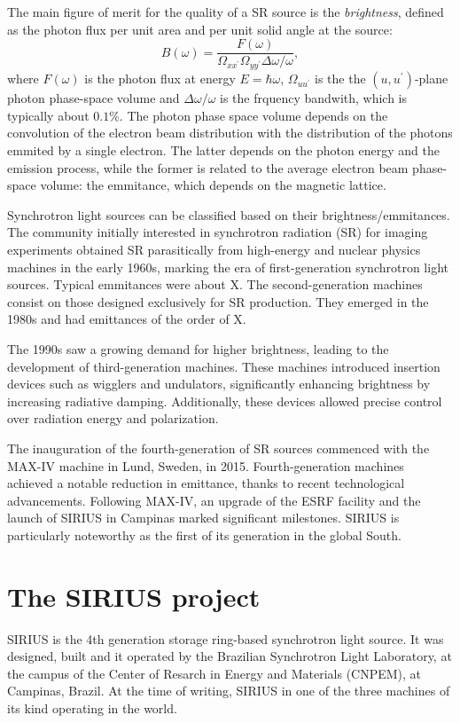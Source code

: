 The main figure of merit for the quality of a SR source is the \textit{brightness}, defined as the photon flux per unit area and per unit solid angle at the source:
\begin{equation}
    B(\omega) = \frac{F(\omega)}{\Omega_{xx^\prime}\Omega_{yy^\prime}\Delta \omega/\omega},
\end{equation}
where $F(\omega)$ is the photon flux at energy $E=\hbar\omega$, $\Omega_{uu^\prime}$ is the the $(u,u^\prime)$-plane photon phase-space volume and $\Delta\omega/\omega$ is the frquency bandwith, which is typically about $0.1\%$. The photon phase space volume depends on the convolution of the electron beam distribution with the distribution of the photons emmited by a single electron. The latter depends on the photon energy and the emission process, while the former is related to the average electron beam phase-space volume: the emmitance, which depends on the magnetic lattice.

Synchrotron light sources can be classified based on their brightness/emmitances. The community initially interested in synchrotron radiation (SR) for imaging experiments obtained SR parasitically from high-energy and nuclear physics machines in the early 1960s, marking the era of first-generation synchrotron light sources. Typical emmitances were about X. The second-generation machines consist on those designed exclusively for SR production. They emerged in the 1980s and had emittances of the order of X.

The 1990s saw a growing demand for higher brightness, leading to the development of third-generation machines. These machines introduced insertion devices such as wigglers and undulators, significantly enhancing brightness by increasing radiative damping. Additionally, these devices allowed precise control over radiation energy and polarization.

The inauguration of the fourth-generation of SR sources commenced with the MAX-IV machine in Lund, Sweden, in 2015. Fourth-generation machines achieved a notable reduction in emittance, thanks to recent technological advancements. Following MAX-IV, an upgrade of the ESRF facility and the launch of SIRIUS in Campinas marked significant milestones. SIRIUS is particularly noteworthy as the first of its generation in the global South.

\section{The SIRIUS project}
SIRIUS is the 4th generation storage ring-based synchrotron light source. It was designed, built and it operated by the Brazilian Synchrotron Light Laboratory, at the campus of the Center of Resarch in Energy and Materials (CNPEM), at Campinas, Brazil. At the time of writing, SIRIUS in one of the three machines of its kind operating in the world.

